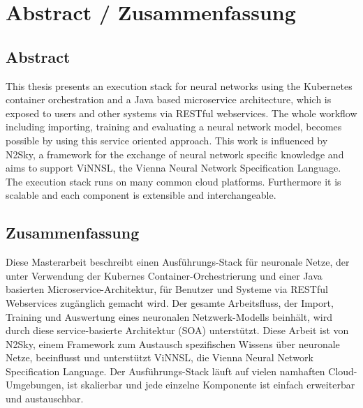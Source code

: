 \hypertarget{abstract-zusammenfassung}{%
\chapter*{Abstract / Zusammenfassung}\label{abstract-zusammenfassung}}

\hypertarget{abstract}{%
\section*{Abstract}\label{abstract}}

This thesis presents an execution stack for neural networks using the
Kubernetes container orchestration and a Java based microservice
architecture, which is exposed to users and other systems via RESTful
webservices. The whole workflow including importing, training and
evaluating a neural network model, becomes possible by using this
service oriented approach. This work is influenced by N2Sky, a framework
for the exchange of neural network specific knowledge and aims to
support ViNNSL, the Vienna Neural Network Specification Language. The
 execution stack runs on many common cloud platforms.
Furthermore it is scalable and each component is extensible and
interchangeable.

\hypertarget{zusammenfassung}{%
\section*{Zusammenfassung}\label{zusammenfassung}}

Diese Masterarbeit beschreibt einen Ausführungs-Stack für neuronale
Netze, der unter Verwendung der Kubernes Container-Orchestrierung und
einer Java basierten Microservice-Architektur, für Benutzer und Systeme
via RESTful Webservices zugänglich gemacht wird. Der gesamte
Arbeitsfluss, der Import, Training und Auswertung eines neuronalen
Netzwerk-Modells beinhält, wird durch diese service-basierte Architektur
(SOA) unterstützt. Diese Arbeit ist von N2Sky, einem Framework zum Austausch spezifischen Wissens über neuronale Netze, beeinflusst und unterstützt ViNNSL, die Vienna Neural Network Specification Language. Der Ausführungs-Stack läuft auf vielen namhaften
Cloud-Umgebungen, ist skalierbar und jede einzelne Komponente ist
einfach erweiterbar und austauschbar.
